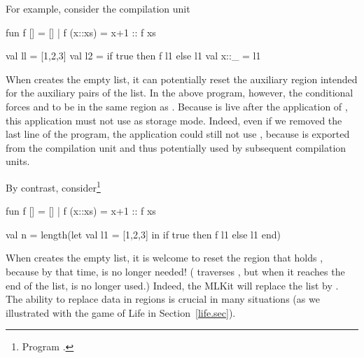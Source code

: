 \documentclass[12pt]{book}
\begin{document}
For example, consider the compilation unit
\begin{smlcode}
  fun f [] = []
    | f (x::xs) = x+1 :: f xs

  val ll = [1,2,3]
  val l2 = if true then f l1 else l1
  val x::_ = l1
\end{smlcode}

\noindent
When  creates the empty list, it can potentially reset the
%
%
%
auxiliary region intended for the
%
%
%
auxiliary pairs of the list. In the above program, however, the conditional
forces  and  to be in the same region as .  Because
 is live after the application of , this application must not use
 as storage mode.  Indeed, even if we removed the last line of the
program, the application could still not use , because  is
exported from the compilation unit and thus potentially used by subsequent
compilation units.

By contrast, consider\footnote{Program .}
\begin{smlcode}
  fun f [] = []
    | f (x::xs) = x+1 :: f xs

  val n = length(let val l1 = [1,2,3]
                 in if true then f l1 else l1
                 end)
\end{smlcode}

\noindent
When  creates the empty list, it is welcome to reset the region that holds
, because by that time,  is no longer needed! ( traverses
, but when it reaches the end of the list,  is no longer used.)
Indeed, the MLKit will replace the list \kw{[1,2,3]} by \kw{[2,3,4]}. The
ability to replace data in regions is crucial in many situations (as we
illustrated with the game of Life in Section~\ref{life.sec}).
\end{document}
